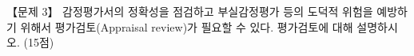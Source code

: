 \begin{longquestion}{【문제 3】}
감정평가서의 정확성을 점검하고 부실감정평가 등의 도덕적 위험을 예방하기 위해서 평가검토(Appraisal review)가 필요할 수 있다. 평가검토에 대해 설명하시오. (15점) \par
\end{longquestion}
